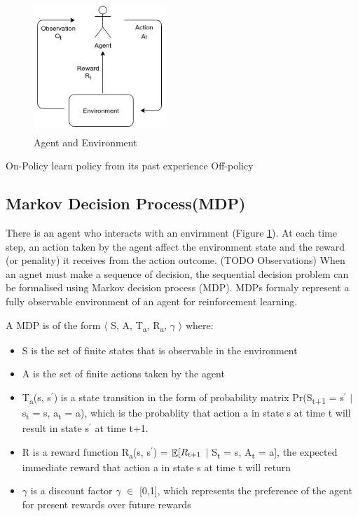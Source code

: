 \documentclass[12pt,twoside]{report}
\DeclareMathOperator{\E}{\mathbb{E}}
\begin{document}
\begin{figure}[!htb]
\centering
\includegraphics[width=5cm, height=5cm]{./figures/agent_env}
\caption{Agent and Environment}
\label{agent_env}
\end{figure}


On-Policy learn policy \pi from its past experience
Off-policy

\subsection{Markov Decision Process(MDP)}

There is an agent who interacts with an envirnment (Figure \ref{agent_env}). At each time step, an action taken by the agent affect the environment state and the reward (or penality) it receives from the action outcome. (TODO Observations)
When an agnet must make a sequence of decision, the sequential decision problem can be formalised using Markov decision process (MDP). MDPs formaly represent a fully observable environment of an agent for reinforcement learning.

A MDP is of the form $\langle$ S, A, T\textsubscript{a}, R\textsubscript{a}, $\gamma$ $\rangle$ where: \\

\begin{itemize}
\item S is the set of finite states that is observable in the environment
\item A is the set of finite actions taken by the agent
\item T\textsubscript{a}(s, s$^\prime$) is a state transition in the form of probability matrix Pr(S\textsubscript{t+1} = s$^\prime$ $\vert$ s\textsubscript{t} = s, a\textsubscript{t} = a), which is the probablity that action a in state s at time t will result in state s$^\prime$ at time t+1.
\item R is a reward function R\textsubscript{a}(s, s$^\prime$) = $\displaystyle \E[R\textsubscript{t+1} $ $\vert$ S\textsubscript{t} = s, A\textsubscript{t} = a], the expected immediate reward that action a in state s at time t will return
\item $\gamma$ is a discount factor $\gamma$ $\in$ [0,1], which represents the preference of the agent for present rewards over future rewards

\end{itemize}
\end{document}

